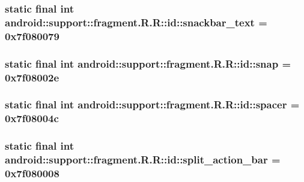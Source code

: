 \hypertarget{classandroid_1_1support_1_1fragment_1_1_r_1_1id_b844f2fe09f5e75e027f7099752cf098}{
\subsubsection[{snackbar\_\-text}]{\setlength{\rightskip}{0pt plus 5cm}static final int android::support::fragment.R.R::id::snackbar\_\-text = 0x7f080079}}
\label{classandroid_1_1support_1_1fragment_1_1_r_1_1id_b844f2fe09f5e75e027f7099752cf098}


\hypertarget{classandroid_1_1support_1_1fragment_1_1_r_1_1id_2d875bde2cfad091fc9b69c332b3cdec}{
\subsubsection[{snap}]{\setlength{\rightskip}{0pt plus 5cm}static final int android::support::fragment.R.R::id::snap = 0x7f08002e}}
\label{classandroid_1_1support_1_1fragment_1_1_r_1_1id_2d875bde2cfad091fc9b69c332b3cdec}


\hypertarget{classandroid_1_1support_1_1fragment_1_1_r_1_1id_6922c216b6791a56b528c29d4b7acfd9}{
\subsubsection[{spacer}]{\setlength{\rightskip}{0pt plus 5cm}static final int android::support::fragment.R.R::id::spacer = 0x7f08004c}}
\label{classandroid_1_1support_1_1fragment_1_1_r_1_1id_6922c216b6791a56b528c29d4b7acfd9}


\hypertarget{classandroid_1_1support_1_1fragment_1_1_r_1_1id_8e76a8a3786e4bd46c6cdea892fd8ba4}{
\subsubsection[{split\_\-action\_\-bar}]{\setlength{\rightskip}{0pt plus 5cm}static final int android::support::fragment.R.R::id::split\_\-action\_\-bar = 0x7f080008}}
\label{classandroid_1_1support_1_1fragment_1_1_r_1_1id_8e76a8a3786e4bd46c6cdea892fd8ba4}


